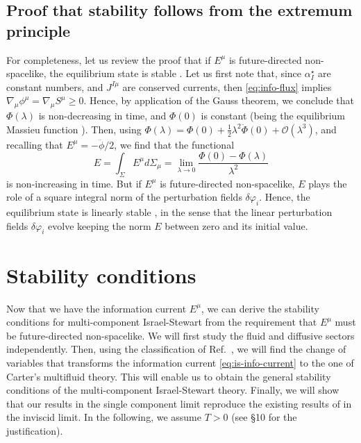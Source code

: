 \documentclass[
a4paper,
amsfonts,
amsmath,
reprint,
showkeys,
nofootinbib,
twoside,
onecolumn,
notitlepage
]{revtex4-1}
\begin{document}
	\subsection{Proof that stability follows from the extremum principle}
	
	For completeness, let us review the proof that if $E^\mu$ is future-directed non-spacelike, the equilibrium state is stable \cite{GavassinoGibbs2021}.
	Let us first note that, since $\alpha^\star_I$ are constant numbers, and $J^{I\mu}$ are conserved currents, then \eqref{eq:info-flux} implies $\nabla_\mu \phi^\mu = \nabla_\mu S^\mu \geq 0$.  
	Hence, by application of the Gauss theorem, we conclude that $\Phi(\lambda)$ is non-decreasing in time, and $\Phi(0)$ is constant (being the equilibrium Massieu function \cite{Callen_book}).
	Then, using $\Phi(\lambda) = \Phi(0) + \frac{1}{2} \lambda^2\ddot{\Phi}(0)+\mathcal{O}(\lambda^3)$, and recalling that $E^\mu = -\ddot{\phi}/2$, we find that the functional
	\begin{equation}
		E= \int_\Sigma E^\mu d\Sigma_\mu= \lim_{\lambda \rightarrow 0} \dfrac{ \Phi(0)-\Phi(\lambda)}{\lambda^2} 
	\end{equation}
	is non-increasing in time.
	But if $E^\mu$ is future-directed non-spacelike, $E$ plays the role of a square integral norm of the perturbation fields $\delta \varphi_i$. 
	Hence, the equilibrium state is linearly stable \cite{Geroch_Lindblom_1991_causal}, in the sense that the linear perturbation fields $\delta \varphi_i$ evolve keeping the norm $E$ between zero and its initial value.
	
	
	\section{Stability conditions}\label{sec:multi-is-stabilty}
	
	Now that we have the information current $E^\mu$, we can derive the stability conditions for multi-component Israel-Stewart from the requirement that $E^\mu$ must be future-directed non-spacelike. 
	We will first study the fluid and diffusive sectors independently. 
	Then, using the classification of Ref.\ \cite{GavassinoUniversality2023}, we will find the change of variables that transforms the information current \eqref{eq:is-info-current} to the one of Carter's multifluid theory. 
	This will enable us to obtain the general stability conditions of the multi-component Israel-Stewart theory. 
	Finally, we will show that our results in the single component limit reproduce the existing results of \citet{OlsonRegular1990} in the inviscid limit.
	In the following, we assume $T>0$ (see \S 10 \cite{landau5} for the justification).
	
\end{document}
